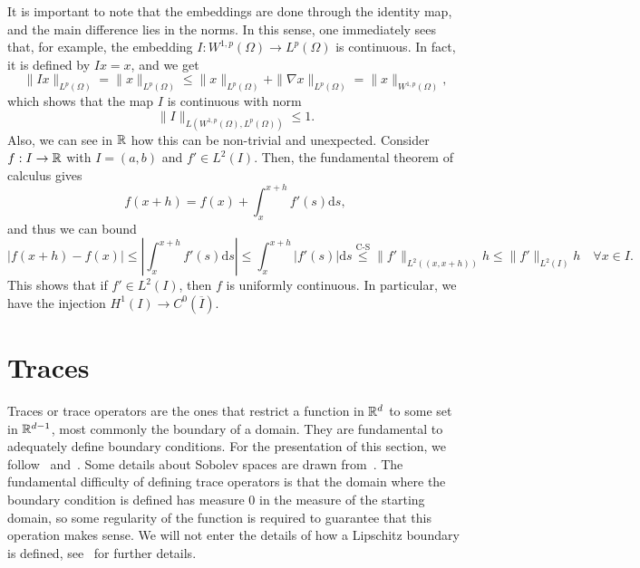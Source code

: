 It is important to note that the embeddings are done through the identity map, and the main difference lies in the norms. In this sense, one immediately sees that, for example, the embedding $I:W^{1,p}(\Omega)\to L^p(\Omega)$ is continuous. In fact, it is defined by $Ix=x$, and we get
\begin{equation*}
    \|Ix\|_{L^p(\Omega)} = \|x\|_{L^p(\Omega)} \leq \|x\|_{L^p(\Omega)} + \|\nabla x\|_{L^p(\Omega)} = \|x\|_{W^{1,p}(\Omega)},
\end{equation*}
which shows that the map $I$ is continuous with norm 
\begin{equation*}
    \|I\|_{L(W^{1,p}(\Omega), L^p(\Omega))}\leq 1.
\end{equation*}
Also, we can see in $\mathbb{R}$ how this can be non-trivial and unexpected. Consider $f:I\to \mathbb{R}$ with $I=(a,b)$ and $f'\in L^2(I)$. Then, the fundamental theorem of calculus gives
\begin{equation*}
    f(x+h) = f(x) + \int_x^{x+h}f'(s)\mathrm{d}s,
\end{equation*}
and thus we can bound
\begin{equation*}
    |f(x+h)-f(x)|\leq \left|\int_x^{x+h}f'(s)\mathrm{d}s\right|\leq \int_x^{x+h}|f'(s)|\mathrm{d}s \overset{\text{C-S}}{\leq} \|f'\|_{L^2((x,x+h))}h \leq \|f'\|_{L^2(I)}h \quad \forall x\in I.
\end{equation*}
This shows that if $f'\in L^2(I)$, then $f$ is uniformly continuous. In particular, we have the injection $H^1(I)\to C^0(\overline{I})$. 
\section{Traces}

Traces or trace operators are the ones that restrict a function in $\mathbb{R}^d$ to some set in $\mathbb{R}^{d-1}$, most commonly the boundary of a domain. They are fundamental to adequately define boundary conditions. For the presentation of this section, we follow~\cite{gatica2014simple} and~\cite{monk2003finite}. Some details about Sobolev spaces are drawn from~\cite{adams2003sobolev}. The fundamental difficulty of defining trace operators is that the domain where the boundary condition is defined has measure 0 in the measure of the starting domain, so some regularity of the function is required to guarantee that this operation makes sense. We will not enter the details of how a Lipschitz boundary is defined, see~\cite{monk2003finite} for further details.

